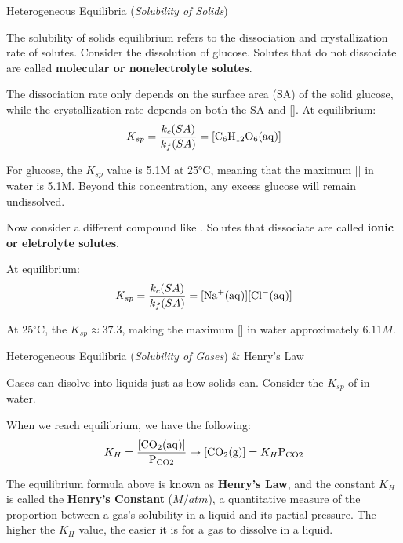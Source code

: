 \documentclass[10pt]{article}
\begin{document}
    \begin{core}{Heterogeneous Equilibria (\textit{Solubility of Solids})}
      
      The solubility of solids equilibrium refers to the dissociation and crystallization rate of solutes. Consider the dissolution of glucose. Solutes that do not dissociate are called \textbf{molecular or nonelectrolyte solutes}.




      The dissociation rate only depends on the surface area (SA) of the solid glucose, while the crystallization rate depends on both the SA and []. At equilibrium:
      \[
        K_{sp} = \frac{k_c(SA)}{k_f(SA)} = [\ce{C6H12O6(aq)}]
      \]

      For glucose, the $K_{sp}$ value is 5.1M at 25°C, meaning that the maximum [] in water is 5.1M. Beyond this concentration, any excess glucose will remain undissolved.

      Now consider a different compound like . Solutes that dissociate are called \textbf{ionic or eletrolyte solutes}.




      At equilibrium:
      \[
        K_{sp} = \frac{k_c(SA)}{k_f(SA)} = [\ce{Na^{+}(aq)}][\ce{Cl^{-}(aq)}]
      \]

      At 25$^\circ$C, the $K_{sp} \approx 37.3$, making the maximum [] in water approximately $6.11M$.

    \end{core}
    
    \begin{core}{Heterogeneous Equilibria (\textit{Solubility of Gases}) \& Henry's Law}

      Gases can disolve into liquids just as how solids can. Consider the $K_{sp}$ of  in water.


      When we reach equilibrium, we have the following:
      \[
        K_{H} = \frac{[\ce{CO2(aq)}]}{\ce{P_{CO2}}} \to [\ce{CO2(g)}] = K_{H} \ce{P_{CO2}}
      \]

      The equilibrium formula above is known as \textbf{Henry's Law}, and the constant $K_H$ is called the \textbf{Henry's Constant} ($M/atm$), a quantitative measure of the proportion between a gas's solubility in a liquid and its partial pressure. The higher the $K_H$ value, the easier it is for a gas to dissolve in a liquid.


    \end{core}  
\end{document}
